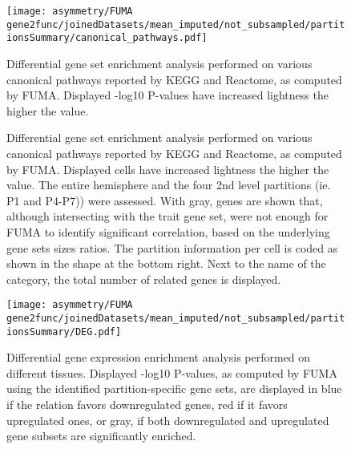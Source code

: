 \begin{figure}[H]
	\centering
	\texttt{[image: asymmetry/FUMA gene2func/joinedDatasets/mean\_imputed/not\_subsampled/partitionsSummary/canonical\_pathways.pdf]}
	
	\caption[Canonical pathways GSEA -log10P values]{Differential gene set enrichment analysis performed on various canonical pathways reported by KEGG and Reactome, as computed by FUMA. Displayed -log10 P-values have increased lightness the higher the value.}
	\label{fig:can_pathways}
\end{figure}
\begin{figure}[H]
	
	\begin{adjustwidth}{-3cm}{-2.5cm}
	\centering
	\par\medskip
	\raggedleft
	\caption[Canonical pathways GSEA genes]{Differential gene set enrichment analysis performed on various canonical pathways reported by KEGG and Reactome, as computed by FUMA. Displayed cells have increased lightness the higher the value. The entire hemisphere and the four 2nd level partitions (ie. P1 and P4-P7)) were assessed. With gray, genes are shown that, although intersecting with the trait gene set, were not enough for FUMA to identify significant correlation, based on the underlying gene sets sizes ratios. The partition information per cell is coded as shown in the shape at the bottom right. Next to the name of the category, the total number of related genes is displayed.}
	\label{fig:can_pathways_genes}
	
\end{adjustwidth}
\end{figure}
\begin{figure}[H]
	\centering
	\texttt{[image: asymmetry/FUMA gene2func/joinedDatasets/mean\_imputed/not\_subsampled/partitionsSummary/DEG.pdf]}	
	\caption[Differential gene expression enrichment analysis]{Differential gene expression enrichment analysis performed on different tissues. Displayed -log10 P-values, as computed by FUMA using the identified partition-specific gene sets, are displayed in blue if the relation favors downregulated genes, red if it favors upregulated ones, or gray, if both downregulated and upregulated gene subsets are significantly enriched.}
	\label{fig:de_genes}
\end{figure}
